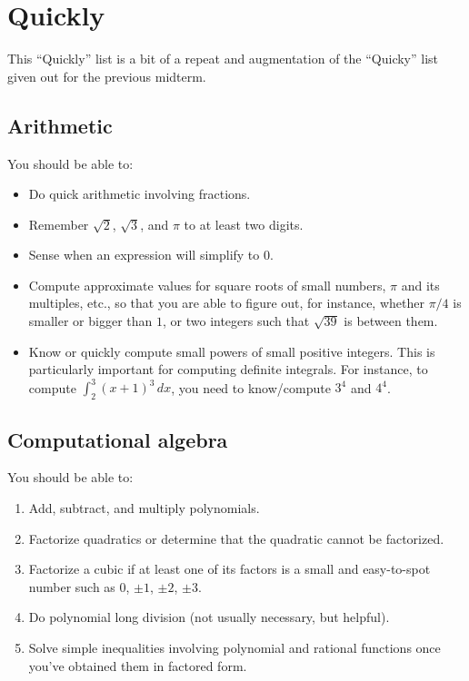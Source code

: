 \documentclass[10pt]{amsart}
\begin{document}
\section{Quickly}

This ``Quickly'' list is a bit of a repeat and augmentation of the
``Quicky'' list given out for the previous midterm.

\subsection{Arithmetic}

You should be able to:

\begin{itemize}
\item Do quick arithmetic involving fractions.
\item Remember $\sqrt{2}$, $\sqrt{3}$, and $\pi$ to at least two
  digits.
\item Sense when an expression will simplify to $0$.
\item Compute approximate values for square roots of small numbers,
  $\pi$ and its multiples, etc., so that you are able to figure out,
  for instance, whether $\pi/4$ is smaller or bigger than $1$, or two
  integers such that $\sqrt{39}$ is between them.
\item Know or quickly compute small powers of small positive
  integers. This is particularly important for computing definite
  integrals. For instance, to compute $\int_2^3 (x + 1)^3 \, dx$, you
  need to know/compute $3^4$ and $4^4$.
\end{itemize}

\subsection{Computational algebra}

You should be able to:

\begin{enumerate}
\item Add, subtract, and multiply polynomials.
\item Factorize quadratics or determine that the quadratic cannot be
  factorized.
\item Factorize a cubic if at least one of its factors is a small and
  easy-to-spot number such as $0$, $\pm 1$, $\pm 2$, $\pm 3$.
\item Do polynomial long division (not usually necessary, but helpful).
\item Solve simple inequalities involving polynomial and rational
  functions once you've obtained them in factored form.
\end{enumerate}
\end{document}
